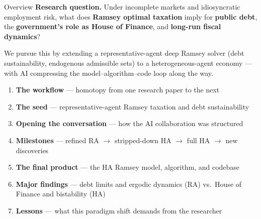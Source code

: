 \documentclass[10pt,aspectratio=169]{beamer}
\begin{document}
\begin{frame}{Overview}
\textbf{Research question.} Under incomplete markets and idiosyncratic employment risk,
what does \textbf{Ramsey optimal taxation} imply for \textbf{public debt}, the
\textbf{government's role as House of Finance}, and \textbf{long-run fiscal dynamics}?

\medskip
We pursue this by extending a representative-agent deep Ramsey solver (debt sustainability,
endogenous admissible sets) to a heterogeneous-agent economy --- with AI compressing the
model--algorithm--code loop along the way.

\medskip
\begin{enumerate}
  \item \textbf{The workflow} --- homotopy from one research paper to the next
  \item \textbf{The seed} --- representative-agent Ramsey taxation and debt sustainability
  \item \textbf{Opening the conversation} --- how the AI collaboration was structured
  \item \textbf{Milestones} --- refined RA $\to$ stripped-down HA $\to$ full HA $\to$ new discoveries
  \item \textbf{The final product} --- the HA Ramsey model, algorithm, and codebase
  \item \textbf{Major findings} --- debt limits and ergodic dynamics (RA) vs.\ House of Finance and bistability (HA)
  \item \textbf{Lessons} --- what this paradigm shift demands from the researcher
\end{enumerate}
\end{frame}
\end{document}

